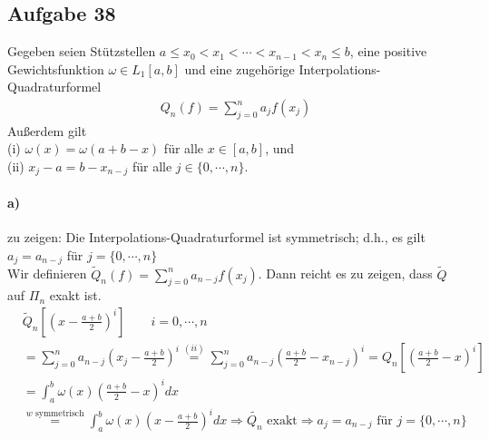 \subsection*{Aufgabe 38}
Gegeben seien Stützstellen $a \le x_0 <  x_1 <  \cdots < x_{n-1} < x_n \le b$, eine positive Gewichtsfunktion $ \omega \in L_1[a,b]$ und eine zugehörige Interpolations-Quadraturformel
\begin{align*}
Q_n(f)=\sum_{j=0}^{n}a_jf(x_j)
\end{align*}
Außerdem gilt\\
(i) $\omega(x)=\omega(a+b-x)$ für alle $x \in [a,b]$, und\\
(ii) $x_j-a=b-x_{n-j}$ für alle $j\in\{0,\cdots,n\}$.
\paragraph{a)} zu zeigen: Die Interpolations-Quadraturformel ist symmetrisch; d.h., es gilt $a_j=a_{n-j}$ für $j=\{0,\cdots,n\}$ \\
\newline
Wir definieren $\tilde{Q}_n(f)=\sum_{j=0}^{n}a_{n-j}f(x_j)$. Dann reicht es zu zeigen, dass $\tilde{Q}$ auf $\Pi_n$ exakt ist.\\
\begin{align*}
&\tilde{Q}_n \left[\left(x-\frac{a+b}{2}\right)^i \right]\qquad i=0,\cdots, n\\
&=\sum_{j=0}^{n}a_{n-j}\left(x_j-\frac{a+b}{2}\right)^i\overset{(ii)}{=}\sum_{j=0}^{n}a_{n-j}\left(\frac{a+b}{2}-x_{n-j}\right)^i=Q_n\left[\left(\frac{a+b}{2}-x\right)^i \right]\\
&=\int_a^b \omega(x)\left(\frac{a+b}{2}-x\right)^i dx\\
&\overset{w \text{ symmetrisch}}{=}\int_a^b \omega (x)\left(x-\frac{a+b}{2}\right)^i dx \Rightarrow \tilde{Q_n} \text{ exakt} \Rightarrow a_j=a_{n-j} \text{ für } j=\{0,\cdots,n\} 
\end{align*}
